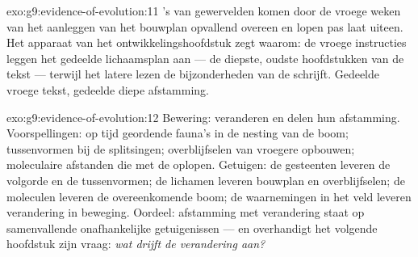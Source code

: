 \begin{solution}{exo:g9:evidence-of-evolution:11}
's van gewervelden komen door de vroege weken van het
aanleggen van het bouwplan opvallend overeen en lopen pas laat
uiteen. Het apparaat van het ontwikkelingshoofdstuk zegt waarom: de
vroege instructies leggen het gedeelde lichaamsplan aan --- de
diepste, oudste hoofdstukken van de tekst --- terwijl het latere
lezen de bijzonderheden van de  schrijft. Gedeelde vroege
tekst, gedeelde diepe afstamming.
\end{solution}

\begin{solution}{exo:g9:evidence-of-evolution:12}
Bewering:  veranderen en delen hun afstamming.
Voorspellingen: op tijd geordende fauna's in de nesting van de
boom; tussenvormen bij de splitsingen; overblijfselen van vroegere
opbouwen; moleculaire afstanden die met de  oplopen.
Getuigen: de gesteenten leveren de volgorde en de tussenvormen; de
lichamen leveren bouwplan en overblijfselen; de moleculen leveren
de overeenkomende boom; de waarnemingen in het veld leveren
verandering in beweging. Oordeel: afstamming met verandering staat
op samenvallende onafhankelijke getuigenissen --- en overhandigt
het volgende hoofdstuk zijn vraag: \emph{wat drijft de verandering
aan?}
\end{solution}

